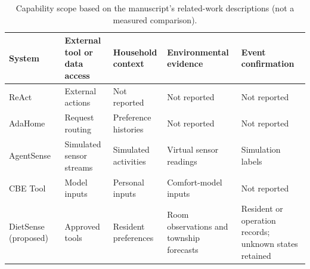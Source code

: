 \begin{table}[t]
\centering\footnotesize
\caption{Capability scope based on the manuscript's related-work descriptions (not a measured comparison).}
\label{tab:capabilities}
\begin{tabularx}{\textwidth}{@{}l Y Y Y Y@{}}
\toprule
System & External tool or data access & Household context & Environmental evidence & Event confirmation \\
\midrule
ReAct~\cite{react} & External actions & Not reported & Not reported & Not reported \\
AdaHome~\cite{adahome} & Request routing & Preference histories & Not reported & Not reported \\
AgentSense~\cite{agentsense} & Simulated sensor streams & Simulated activities & Virtual sensor readings & Simulation labels \\
CBE Tool~\cite{cbe} & Model inputs & Personal inputs & Comfort-model inputs & Not reported \\
DietSense (proposed) & Approved tools & Resident preferences & Room observations and township forecasts & Resident or operation records; unknown states retained \\
\bottomrule
\end{tabularx}
\end{table}
